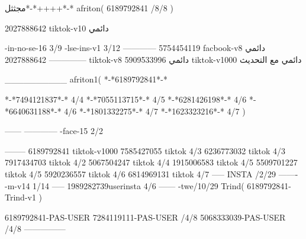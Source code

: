 مجثثل*-*++++*-*
afriton(
6189792841 /8/8
)

2027888642 tiktok-v10
دائمي

-in-no-se-16 3/9
-lse-ins-v1 3/12
------------
5754454119 facbook-v8
دائمي
--------------
2027888642 tiktok-v8
دائمي
5909533996 tiktok-v1000
دائمي مع التحديث

__________
afriton1(
*-*6189792841*-*

*-*7494121837*-* 4/4
*-*7055113715*-* 4/5
*-*6281426198*-* 4/6
*-*6640631188*-* 4/6
*-*1801332275*-* 4/7
*-*1623323216*-* 4/7
)


------
------------
-face-15 2/2

--------
6189792841 tiktok-v1000
7585427055 tiktok 4/3
6236773032 tiktok 4/3
7917434703 tiktok 4/2
5067504247 tiktok 4/4
1915006583 tiktok 4/5
5509701227 tiktok 4/5
5920236557 tiktok 4/6
6814969131 tiktok 4/7
-----
 INSTA /2/29
-------
-m-v14 1/14
-----
1989282739userinsta 4/6
------
-twe/10/29
Trind(
6189792841-Trind-v1 
)

6189792841-PAS-USER
7284119111-PAS-USER /4/8
5068333039-PAS-USER /4/8
    ---------------
